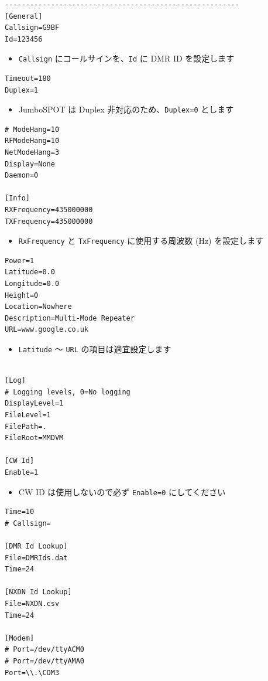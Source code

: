 \documentclass[a4j,oneside]{ujbook}
\begin{document}
\begin{verbatim}
--------------------------------------------------------
[General]
Callsign=G9BF
Id=123456
\end{verbatim}
\begin{itemize}
 \renewcommand{\labelitemi}{$\triangleright$}
 \item \verb+Callsign+ にコールサインを、\verb+Id+ に DMR ID を設定します
\end{itemize}
\begin{verbatim}
Timeout=180
Duplex=1
\end{verbatim}
\begin{itemize}
 \renewcommand{\labelitemi}{$\triangleright$}
 \item JumboSPOT は Duplex 非対応のため、\verb+Duplex=0+ とします
\end{itemize}
\begin{verbatim}
# ModeHang=10
RFModeHang=10
NetModeHang=3
Display=None
Daemon=0

[Info]
RXFrequency=435000000
TXFrequency=435000000
\end{verbatim}
\begin{itemize}
 \renewcommand{\labelitemi}{$\triangleright$}
 \item \verb+RxFrequency+ と \verb+TxFrequency+ に使用する周波数 (Hz) を設定します
\end{itemize}
\begin{verbatim}
Power=1
Latitude=0.0
Longitude=0.0
Height=0
Location=Nowhere
Description=Multi-Mode Repeater
URL=www.google.co.uk
\end{verbatim}
\begin{itemize}
 \renewcommand{\labelitemi}{$\triangleright$}
 \item \verb+Latitude+ 〜 \verb+URL+ の項目は適宜設定します
\end{itemize}
\begin{verbatim}

[Log]
# Logging levels, 0=No logging
DisplayLevel=1
FileLevel=1
FilePath=.
FileRoot=MMDVM

[CW Id]
Enable=1
\end{verbatim}
\begin{itemize}
 \renewcommand{\labelitemi}{$\triangleright$}
 \item CW ID は使用しないので必ず \verb+Enable=0+ にしてください
\end{itemize}
\begin{verbatim}
Time=10
# Callsign=

[DMR Id Lookup]
File=DMRIds.dat
Time=24

[NXDN Id Lookup]
File=NXDN.csv
Time=24

[Modem]
# Port=/dev/ttyACM0
# Port=/dev/ttyAMA0
Port=\\.\COM3
\end{verbatim}
\end{document}
